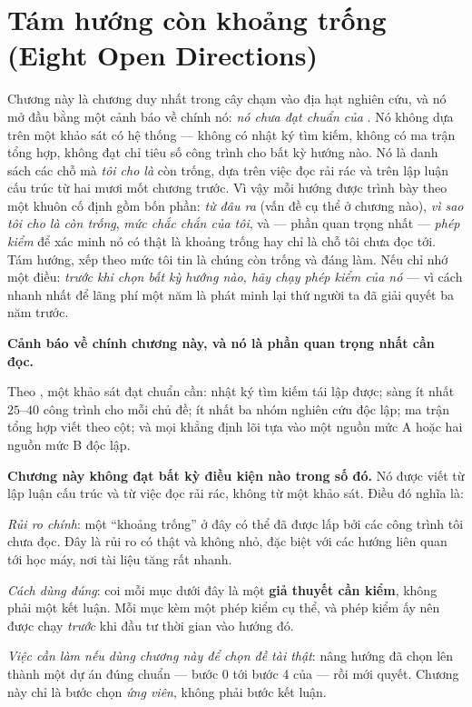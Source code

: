 \documentclass[../../vslam.tex]{subfiles}
\begin{document}
\chapter{Tám hướng còn khoảng trống (Eight Open Directions)}

\begin{tomtat}
Chương này là chương duy nhất trong cây chạm vào địa hạt nghiên cứu, và nó mở đầu bằng một cảnh báo về chính nó: \emph{nó chưa đạt chuẩn của }. Nó không dựa trên một khảo sát có hệ thống --- không có nhật ký tìm kiếm, không có ma trận tổng hợp, không đạt chỉ tiêu số công trình cho bất kỳ hướng nào. Nó là danh sách các chỗ mà \emph{tôi cho là} còn trống, dựa trên việc đọc rải rác và trên lập luận cấu trúc từ hai mươi mốt chương trước. Vì vậy mỗi hướng được trình bày theo một khuôn cố định gồm bốn phần: \emph{từ đâu ra} (vấn đề cụ thể ở chương nào), \emph{vì sao tôi cho là còn trống}, \emph{mức chắc chắn của tôi}, và --- phần quan trọng nhất --- \emph{phép kiểm} để xác minh nó có thật là khoảng trống hay chỉ là chỗ tôi chưa đọc tới. Tám hướng, xếp theo mức tôi tin là chúng còn trống và đáng làm. Nếu chỉ nhớ một điều: \emph{trước khi chọn bất kỳ hướng nào, hãy chạy phép kiểm của nó} --- vì cách nhanh nhất để lãng phí một năm là phát minh lại thứ người ta đã giải quyết ba năm trước.
\end{tomtat}

\begin{cambay}
\textbf{Cảnh báo về chính chương này, và nó là phần quan trọng nhất cần đọc.}

Theo , một khảo sát đạt chuẩn cần: nhật ký tìm kiếm tái lập được; sàng ít nhất \(25\)--\(40\) công trình cho mỗi chủ đề; ít nhất ba nhóm nghiên cứu độc lập; ma trận tổng hợp viết theo cột; và mọi khẳng định lõi tựa vào một nguồn mức A hoặc hai nguồn mức B độc lập.

\textbf{Chương này không đạt bất kỳ điều kiện nào trong số đó.} Nó được viết từ lập luận cấu trúc và từ việc đọc rải rác, không từ một khảo sát. Điều đó nghĩa là:

\emph{Rủi ro chính}: một ``khoảng trống'' ở đây có thể đã được lấp bởi các công trình tôi chưa đọc. Đây là rủi ro có thật và không nhỏ, đặc biệt với các hướng liên quan tới học máy, nơi tài liệu tăng rất nhanh.

\emph{Cách dùng đúng}: coi mỗi mục dưới đây là một \textbf{giả thuyết cần kiểm}, không phải một kết luận. Mỗi mục kèm một phép kiểm cụ thể, và phép kiểm ấy nên được chạy \emph{trước} khi đầu tư thời gian vào hướng đó.

\emph{Việc cần làm nếu dùng chương này để chọn đề tài thật}: nâng hướng đã chọn lên thành một dự án  đúng chuẩn --- bước 0 tới bước 4 của  --- rồi mới quyết. Chương này chỉ là bước chọn \emph{ứng viên}, không phải bước kết luận.
\end{cambay}
\end{document}
